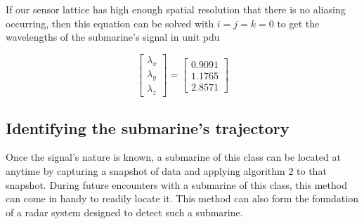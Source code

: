 \documentclass{article}
\begin{document}
If our sensor lattice has high enough spatial resolution that there is no aliasing occurring, then this equation can be solved with $i=j=k=0$ to get the wavelengths of the submarine's signal in unit pdu

\begin{equation}
	\begin{bmatrix}
		\lambda_x\\
		\lambda_y\\
		\lambda_z
	\end{bmatrix} = \begin{bmatrix}
	0.9091\\
	1.1765\\
	2.8571
\end{bmatrix}
\label{eqn:specific_wavelength}
\end{equation}

\subsection{Identifying the submarine's trajectory}

Once the signal's nature is known, a submarine of this class can be located at anytime by capturing a snapshot of data and applying algorithm 2 to that snapshot. During future encounters with a submarine of this class, this method can come in handy to readily locate it. This method can also form the foundation of a radar system designed to detect such a submarine.
\end{document}
